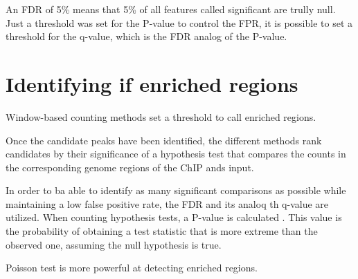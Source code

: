 An FDR of 5\% means that 5\% of all features called significant are trully null.
Just a threshold was set for the P-value to control the FPR, it is possible to set a threshold for the q-value, which is the FDR analog of the P-value.

\section{Identifying if enriched regions}

Window-based counting methods set a threshold to call enriched regions.

Once the candidate peaks have been identified, the different methods rank candidates by their significance of a hypothesis test that compares the counts in the corresponding genome regions of the ChIP ands input.

In order to ba able to identify as many significant comparisons as possible while maintaining a low false positive rate, the FDR and its analoq th q-value are utilized.
When counting hypothesis tests, a P-value is calculated .
This value is the probability of obtaining a test statistic that is more extreme than the observed one, assuming the null hypothesis is true.


Poisson test is more powerful at detecting enriched regions.\cite{}




